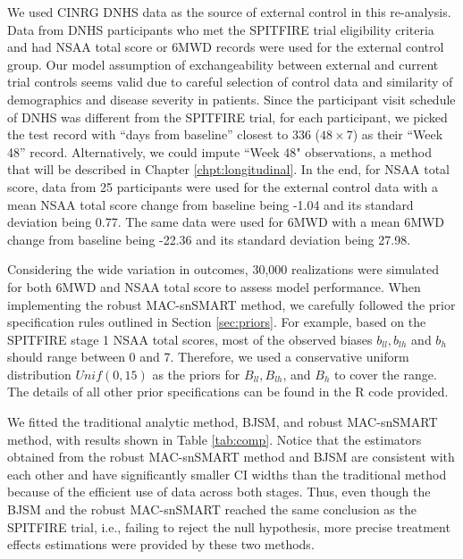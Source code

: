 We used \ac{CINRG} \ac{DNHS} data as the source of external control in this re-analysis. Data from \ac{DNHS} participants who met the SPITFIRE trial eligibility criteria and had \ac{NSAA} total score or \ac{6MWD} records were used for the external control group. Our model assumption of exchangeability between external and current trial controls seems valid due to careful selection of control data and similarity of demographics and disease severity in patients. Since the participant visit schedule of \ac{DNHS} was different from the SPITFIRE trial, for each participant, we picked the test record with ``days from baseline'' closest to 336 ($48 \times 7$) as their ``Week 48'' record. Alternatively, we could impute ``Week 48" observations, a method that will be described in Chapter \ref{chpt:longitudinal}. In the end, for \ac{NSAA} total score, data from 25 participants were used for the external control data with a mean \ac{NSAA} total score change from baseline being -1.04 and its standard deviation being 0.77. The same data were used for \ac{6MWD} with a mean \ac{6MWD} change from baseline being -22.36 and its standard deviation being 27.98.

Considering the wide variation in outcomes, 30,000 realizations were simulated for both \ac{6MWD} and \ac{NSAA} total score to assess model performance. When implementing the robust MAC-snSMART method, we carefully followed the prior specification rules outlined in Section \ref{sec:priors}. For example, based on the SPITFIRE stage 1 \ac{NSAA} total scores, most of the observed biases $b_{ll}, b_{lh}$ and $b_h$ should range between 0 and 7. Therefore, we used a conservative uniform distribution $Unif(0, 15)$ as the priors for $B_{ll}, B_{lh}$, and $B_h$ to cover the range. The details of all other prior specifications can be found in the R code provided. 

We fitted the traditional analytic method, \ac{BJSM}, and robust MAC-snSMART method, with results shown in Table \ref{tab:comp}. Notice that the estimators obtained from the robust MAC-snSMART method and \ac{BJSM} are consistent with each other and have significantly smaller \ac{CI} widths than the traditional method because of the efficient use of data across both stages. Thus, even though the \ac{BJSM} and the robust MAC-snSMART reached the same conclusion as the SPITFIRE trial, i.e., failing to reject the null hypothesis, more precise treatment effects estimations were provided by these two methods.  

